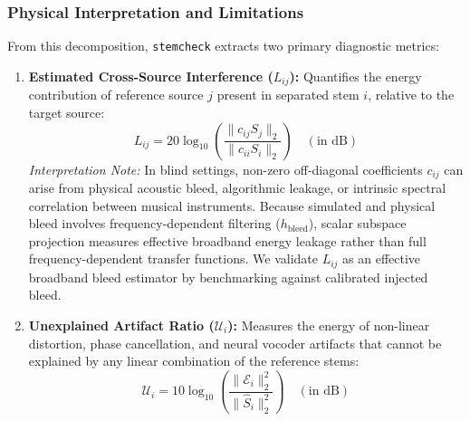 \documentclass[10pt,journal,compsoc]{IEEEtran}
\begin{document}
\subsubsection{Physical Interpretation and Limitations}
From this decomposition, \texttt{stemcheck} extracts two primary diagnostic metrics:
\begin{enumerate}
    \item \textbf{Estimated Cross-Source Interference ($L_{ij}$):} Quantifies the energy contribution of reference source $j$ present in separated stem $i$, relative to the target source:
    \begin{equation}
    L_{ij} = 20 \log_{10} \left( \frac{\|c_{ij} S_j\|_2}{\|c_{ii} S_i\|_2} \right) \quad (\text{in dB})
    \end{equation}
    \textit{Interpretation Note:} In blind settings, non-zero off-diagonal coefficients $c_{ij}$ can arise from physical acoustic bleed, algorithmic leakage, or intrinsic spectral correlation between musical instruments. Because simulated and physical bleed involves frequency-dependent filtering ($h_{\text{bleed}}$), scalar subspace projection measures effective broadband energy leakage rather than full frequency-dependent transfer functions. We validate $L_{ij}$ as an effective broadband bleed estimator by benchmarking against calibrated injected bleed.
    \item \textbf{Unexplained Artifact Ratio ($\mathcal{U}_i$):} Measures the energy of non-linear distortion, phase cancellation, and neural vocoder artifacts that cannot be explained by any linear combination of the reference stems:
    \begin{equation}
    \mathcal{U}_i = 10 \log_{10} \left( \frac{\|\mathcal{E}_i\|_2^2}{\|\hat{S}_i\|_2^2} \right) \quad (\text{in dB})
    \end{equation}
\end{enumerate}
\end{document}
